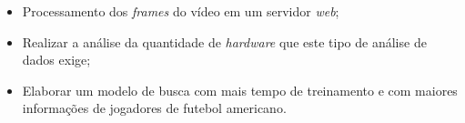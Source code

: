 \begin{itemize}
    \item<1> Processamento dos \textit{frames} do vídeo em um servidor \textit{web};
    \item<1> Realizar a análise da quantidade de \textit{hardware} que este tipo de análise de dados exige;
    \item<1> Elaborar um modelo de busca com mais tempo de treinamento e com maiores informações de jogadores de futebol americano.
\end{itemize}